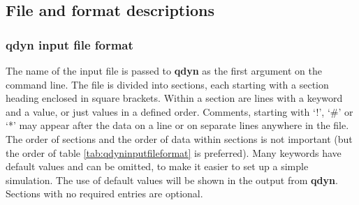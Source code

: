\documentclass[a4paper,10pt]{article}
\begin{document}
\subsection{File and format descriptions}
\subsubsection{\textbf{qdyn} input file format}\label{subsubsec:qdyn_inp_file_form}
The name of the input file is passed to \textbf{qdyn} as the first argument
on the command line. The file is divided into sections, each
starting with a section heading enclosed in square brackets.
Within a section are lines with a keyword and a value, or just
values in a defined order. Comments, starting with `!', `\#' or
`*' may appear after the data on a line or on separate lines
anywhere in the file. The order of sections and the order of data
within sections is not important (but the order of table
\ref{tab:qdyninputfileformat} is preferred). Many keywords have
default values and can be omitted, to make it easier to set up a
simple simulation. The use of default values will be shown in the
output from \textbf{qdyn}. Sections with no required entries are optional.
\small
\end{document}
